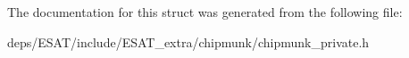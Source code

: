 The documentation for this struct was generated from the following file\+:\begin{DoxyCompactItemize}
\item 
deps/\+E\+S\+A\+T/include/\+E\+S\+A\+T\+\_\+extra/chipmunk/chipmunk\+\_\+private.\+h\end{DoxyCompactItemize}

